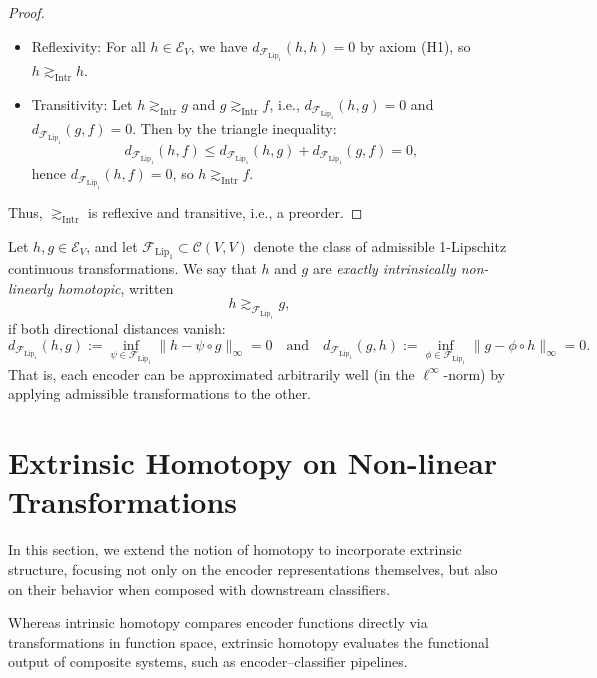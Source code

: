 \begin{proof}
	\begin{itemize}
		\item Reflexivity: For all \( h \in \mathcal{E}_V \), we have \(  d_{\mathcal{F}_{\mathrm{Lip}_1}}(h, h) = 0 \) by axiom (H1), so \( h \gtrsim_{\mathrm{Intr}} h \).
		\item Transitivity: Let \( h \gtrsim_{\mathrm{Intr}} g \) and \( g \gtrsim_{\mathrm{Intr}} f \), i.e., \(  d_{\mathcal{F}_{\mathrm{Lip}_1}}(h, g) = 0 \) and \(  d_{\mathcal{F}_{\mathrm{Lip}_1}}(g, f) = 0 \). Then by the triangle inequality:
		\[
		 d_{\mathcal{F}_{\mathrm{Lip}_1}}(h, f) \leq  d_{\mathcal{F}_{\mathrm{Lip}_1}}(h, g) +  d_{\mathcal{F}_{\mathrm{Lip}_1}}(g, f) = 0,
		\]
		hence \(  d_{\mathcal{F}_{\mathrm{Lip}_1}}(h, f) = 0 \), so \( h \gtrsim_{\mathrm{Intr}} f \).
	\end{itemize}
	
	Thus, \( \gtrsim_{\mathrm{Intr}} \) is reflexive and transitive, i.e., a preorder.
\end{proof}


\begin{definition}
Let \( h, g \in \mathcal{E}_V \), and let \( \mathcal{F}_{\text{Lip}_1} \subset \mathcal{C}(V, V) \) denote the class of admissible 1-Lipschitz continuous transformations.  
We say that \( h \) and \( g \) are \emph{exactly intrinsically non-linearly homotopic}, written
\[
h \gtrsim_{\mathcal{F}_{\text{Lip}_1}} g,
\]
if both directional distances vanish:
\[
d_{\mathcal{F}_{\text{Lip}_1}}(h, g) := \inf_{\psi \in \mathcal{F}_{\text{Lip}_1}} \| h - \psi \circ g \|_\infty = 0
\quad \text{and} \quad
d_{\mathcal{F}_{\text{Lip}_1}}(g, h) := \inf_{\phi \in \mathcal{F}_{\text{Lip}_1}} \| g - \phi \circ h \|_\infty = 0.
\]
That is, each encoder can be approximated arbitrarily well (in the \( \ell^\infty \)-norm) by applying admissible transformations to the other.
\end{definition}




\section{Extrinsic Homotopy on Non-linear Transformations}
\label{ExtrinsicHomotopyonNonlinTransf}
In this section, we extend the notion of homotopy to incorporate extrinsic structure, focusing not only on the encoder representations themselves, but also on their behavior when composed with downstream classifiers.

Whereas intrinsic homotopy compares encoder functions directly via transformations in function space, extrinsic homotopy evaluates the functional output of composite systems, such as encoder–classifier pipelines.

